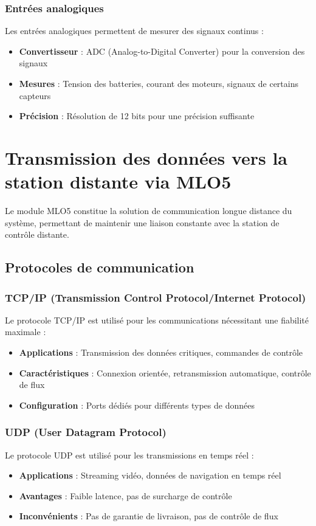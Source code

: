 {\subsubsection{Entrées analogiques}
Les entrées analogiques permettent de mesurer des signaux continus :
\begin{itemize}
    \item \textbf{Convertisseur} : ADC (Analog-to-Digital Converter) pour la conversion des signaux
    \item \textbf{Mesures} : Tension des batteries, courant des moteurs, signaux de certains capteurs
    \item \textbf{Précision} : Résolution de 12 bits pour une précision suffisante
\end{itemize}

\section{Transmission des données vers la station distante via MLO5}
Le module MLO5 constitue la solution de communication longue distance du système, permettant de maintenir une liaison constante avec la station de contrôle distante.

\subsection{Protocoles de communication}
\subsubsection{TCP/IP (Transmission Control Protocol/Internet Protocol)}
Le protocole TCP/IP est utilisé pour les communications nécessitant une fiabilité maximale :
\begin{itemize}
    \item \textbf{Applications} : Transmission des données critiques, commandes de contrôle
    \item \textbf{Caractéristiques} : Connexion orientée, retransmission automatique, contrôle de flux
    \item \textbf{Configuration} : Ports dédiés pour différents types de données
\end{itemize}

\subsubsection{UDP (User Datagram Protocol)}
Le protocole UDP est utilisé pour les transmissions en temps réel :
\begin{itemize}
    \item \textbf{Applications} : Streaming vidéo, données de navigation en temps réel
    \item \textbf{Avantages} : Faible latence, pas de surcharge de contrôle
    \item \textbf{Inconvénients} : Pas de garantie de livraison, pas de contrôle de flux
\end{itemize}

}
